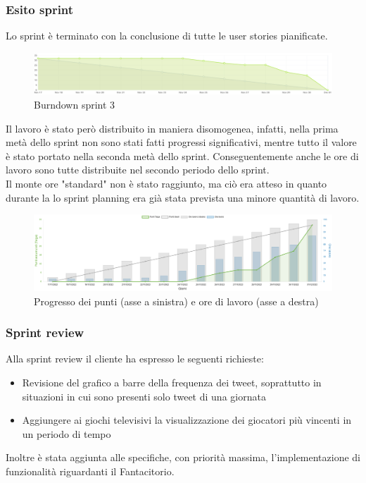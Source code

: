 \subsubsection{Esito sprint}
Lo sprint è terminato con la conclusione di tutte le user stories pianificate.\\
\begin{figure}[H]
    \centering
    \includegraphics[width=15cm]{./img/sprint3/burndown.png}
    \caption{Burndown sprint 3}
\end{figure}
Il lavoro è stato però distribuito in maniera disomogenea, infatti, nella prima metà dello sprint non sono stati fatti progressi significativi,
mentre tutto il valore è stato portato nella seconda metà dello sprint. 
Conseguentemente anche le ore di lavoro sono tutte distribuite nel secondo periodo dello sprint.\\
Il monte ore "standard" non è stato raggiunto, ma ciò era atteso in quanto durante la lo sprint planning era già stata prevista una minore quantità di lavoro.
\begin{figure}[H]
    \centering
    \includegraphics[width=15cm]{./img/sprint3/worktime.png}
    \caption{Progresso dei punti (asse a sinistra) e ore di lavoro (asse a destra)}
\end{figure}


\subsubsection{Sprint review}
Alla sprint review il cliente ha espresso le seguenti richieste:
\begin{itemize}
    \item Revisione del grafico a barre della frequenza dei tweet, soprattutto in situazioni in cui sono presenti solo tweet di una giornata
    \item Aggiungere ai giochi televisivi la visualizzazione dei giocatori più vincenti in un periodo di tempo
\end{itemize} 
Inoltre è stata aggiunta alle specifiche, con priorità massima, l'implementazione di funzionalità riguardanti il Fantacitorio.


